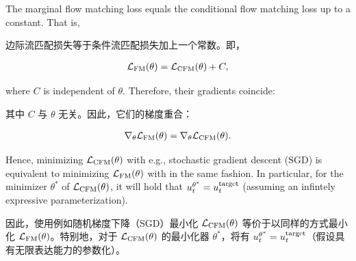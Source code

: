 \begin{theorem}
\label{thm:fm_loss} 
The marginal flow matching loss equals the conditional flow matching loss up to a constant. That is,

边际流匹配损失等于条件流匹配损失加上一个常数。即，

\begin{align*}
\mathcal{L}_{\text{FM}}(\theta) = \mathcal{L}_{\text{CFM}}(\theta) + C,
\end{align*}

where $C$ is independent of $\theta$. Therefore, their gradients coincide:

其中 $C$ 与 $\theta$ 无关。因此，它们的梯度重合：

\begin{align*}
\nabla_\theta \mathcal{L}_{\text{FM}}(\theta) = \nabla_\theta \mathcal{L}_{\text{CFM}}(\theta).
\end{align*}

Hence, minimizing $\mathcal{L}_{\text{CFM}}(\theta)$ with e.g., stochastic gradient descent (SGD) is equivalent to minimizing $\mathcal{L}_{\text{FM}}(\theta)$ with in the same fashion. In particular, for the minimizer $\theta^*$ of $\mathcal{L}_{\text{CFM}}(\theta)$, it will hold that $u_t^{\theta^*}=u^{\text{target}}_t$ (assuming an infintely expressive parameterization). 

因此，使用例如随机梯度下降（SGD）最小化 $\mathcal{L}_{\text{CFM}}(\theta)$ 等价于以同样的方式最小化 $\mathcal{L}_{\text{FM}}(\theta)$。特别地，对于 $\mathcal{L}_{\text{CFM}}(\theta)$ 的最小化器 $\theta^*$，将有 $u_t^{\theta^*}=u^{\text{target}}_t$（假设具有无限表达能力的参数化）。
\end{theorem}
